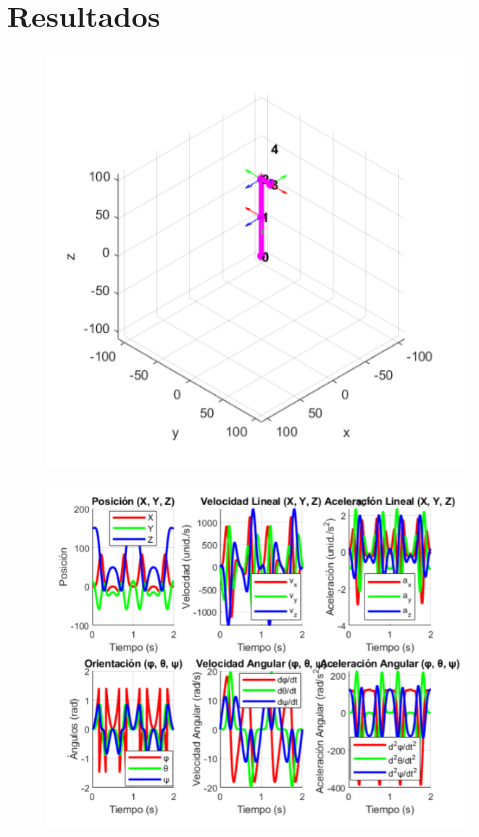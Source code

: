 

\chapter{Resultados} \label{chap:resultados}

\begin{figure}[H]  %
	\centering
	\includegraphics[width=0.7\linewidth]{img/grafica1directa}
	\caption{}
	\label{fig:grafica1directa}
\end{figure}

\begin{figure}[H]
	\centering
	\includegraphics[width=0.7\linewidth]{img/imagen2directa}
	\caption{}
	\label{fig:imagen2directa}
\end{figure}

